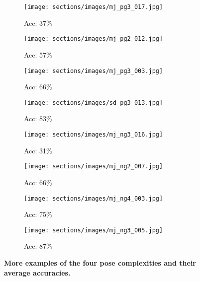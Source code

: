 \begin{figure}[H]
{\begin{minipage}{\textwidth}
\vspace{0.3cm}

\begin{subfigure}{0.22\linewidth}
    \texttt{[image: sections/images/mj\_pg3\_017.jpg]}
    \caption{Acc: 37\%}
\end{subfigure}
\hfill
\begin{subfigure}{0.22\linewidth}
    \texttt{[image: sections/images/mj\_pg2\_012.jpg]}
    \caption{Acc: 57\%}
\end{subfigure}
\hfill
\begin{subfigure}{0.22\linewidth}
    \texttt{[image: sections/images/mj\_pg3\_003.jpg]}
    \caption{Acc: 66\%}
\end{subfigure}
\hfill
\begin{subfigure}{0.22\linewidth}
    \texttt{[image: sections/images/sd\_pg3\_013.jpg]}
    \caption{Acc: 83\%}
\end{subfigure}

\vspace{0.3cm}

\begin{subfigure}{0.22\linewidth}
    \texttt{[image: sections/images/mj\_ng3\_016.jpg]}
    \caption{Acc: 31\%}
\end{subfigure}
\hfill
\begin{subfigure}{0.22\linewidth}
    \texttt{[image: sections/images/mj\_ng2\_007.jpg]}
    \caption{Acc: 66\%}
\end{subfigure}
\hfill
\begin{subfigure}{0.22\linewidth}
    \texttt{[image: sections/images/mj\_ng4\_003.jpg]}
    \caption{Acc: 75\%}
\end{subfigure}
\hfill
\begin{subfigure}{0.22\linewidth}
    \texttt{[image: sections/images/mj\_ng3\_005.jpg]}
    \caption{Acc: 87\%}
\end{subfigure}

\end{minipage}
}
\vspace{-2mm}
\caption{\textbf{More examples of the four pose complexities and their average accuracies.} }
\label{fig:pose-comprehensive}
\end{figure}
\FloatBarrier
\twocolumn
\clearpage
